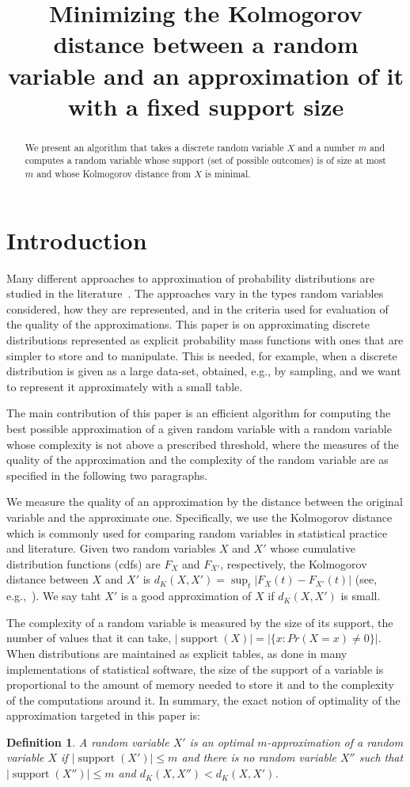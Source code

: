 \documentclass{article}
\title{Minimizing the Kolmogorov distance between a random variable and an approximation of it with a fixed support size}
\newtheorem{definition}[thm]{Definition}
\DeclareMathOperator{\support}{support}
\begin{document}
\maketitle
\begin{abstract}
	We present an algorithm that takes a discrete random variable $X$ and a number $m$ and computes a random variable whose support (set of possible outcomes) is of size at most $m$ and whose Kolmogorov distance from $X$ is minimal.
\end{abstract}


\section{Introduction}

Many different approaches to approximation of probability distributions are studied in the literature~\cite{AMCR83,pavlikov2016cvar,PS77}. 
The approaches vary in the types random variables considered, how they are represented, and in the criteria used for evaluation of the quality of the approximations. This paper is on approximating discrete distributions represented as explicit probability mass functions with ones that are simpler to store and to manipulate. This is needed, for example, when a discrete distribution is given as a large data-set, obtained, e.g., by sampling, and we want to represent it approximately with a small table.  

The main contribution of this paper is an efficient algorithm for computing the best possible approximation of a given random variable with a random variable whose complexity is not above a prescribed threshold, where the measures of the quality of the approximation and the complexity of the random variable are as specified in the following two paragraphs. 

We measure the quality of an approximation by the distance between the original variable and the approximate one. Specifically, we use the Kolmogorov distance which is  commonly used for comparing random variables in statistical practice and literature. Given two random variables $X$ and $X'$ whose cumulative distribution functions (cdfs) are $F_X$ and $F_{X'}$, respectively, the Kolmogorov distance between $X$ and $X'$ is $d_K(X,X')= \sup_t |F_X(t) - F_{X'}(t)|$ (see, e.g.,~\cite{gibbons2011nonparametric}). We say taht $X'$ is a good approximation of $X$ if $d_K(X,X')$ is small.

The complexity of a random variable is measured by the size of its support, the number of values that it can take, $|\support(X)|=|\{x\colon Pr(X=x) \neq 0\}|$. When distributions are maintained as explicit tables, as done in many implementations of statistical software, the size of the support of a variable is proportional to the amount of memory needed to store it and to the complexity of the computations around it. In summary, the exact notion of optimality of the approximation targeted in this paper is:
\begin{definition}
	A random variable $X'$ is an optimal $m$-approximation of a random variable $X$ if $|\support(X')| \leq m$ and there is no random variable $X''$ such that $|\support(X'')| \leq m$ and $d_K(X,X'') < d_K(X,X')$.
\end{definition}
\end{document}
